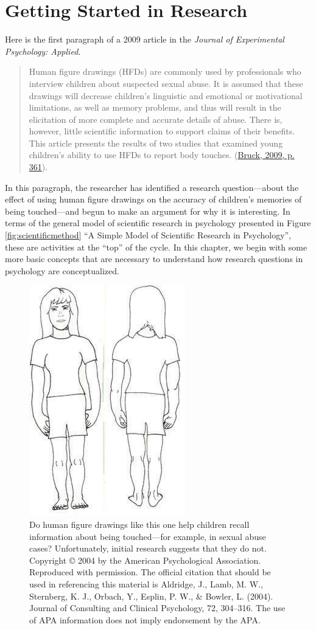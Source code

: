 \documentclass[
]{krantz}
\begin{document}
\hypertarget{getting-started-in-research}{%
\chapter{Getting Started in Research}\label{getting-started-in-research}}

Here is the first paragraph of a 2009 article in the \emph{Journal of Experimental Psychology: Applied}.

\begin{quote}
Human figure drawings (HFDs) are commonly used by professionals who interview children about suspected sexual abuse. It is assumed that these drawings will decrease children's linguistic and emotional or motivational limitations, as well as memory problems, and thus will result in the elicitation of more complete and accurate details of abuse. There is, however, little scientific information to support claims of their benefits. This article presents the results of two studies that examined young children's ability to use HFDs to report body touches. (\protect\hyperlink{ref-bruck2009human}{Bruck, 2009, p. 361}).
\end{quote}

In this paragraph, the researcher has identified a research question---about the effect of using human figure drawings on the accuracy of children's memories of being touched---and begun to make an argument for why it is interesting. In terms of the general model of scientific research in psychology presented in Figure \ref{fig:scientificmethod} ``A Simple Model of Scientific Research in Psychology'', these are activities at the ``top'' of the cycle. In this chapter, we begin with some more basic concepts that are necessary to understand how research questions in psychology are conceptualized.

\begin{figure}

{\centering \includegraphics[width=0.25\linewidth]{images/getting-started/bruck} 

}

\caption{Do human figure drawings like this one help children recall information about being touched—for example, in sexual abuse cases? Unfortunately, initial research suggests that they do not. Copyright © 2004 by the American Psychological Association. Reproduced with permission. The official citation that should be used in referencing this material is Aldridge, J., Lamb, M. W., Sternberg, K. J., Orbach, Y., Esplin, P. W., \& Bowler, L. (2004). Journal of Consulting and Clinical Psychology, 72, 304–316. The use of APA information does not imply endorsement by the APA.}\label{fig:bruck}
\end{figure}
\end{document}
